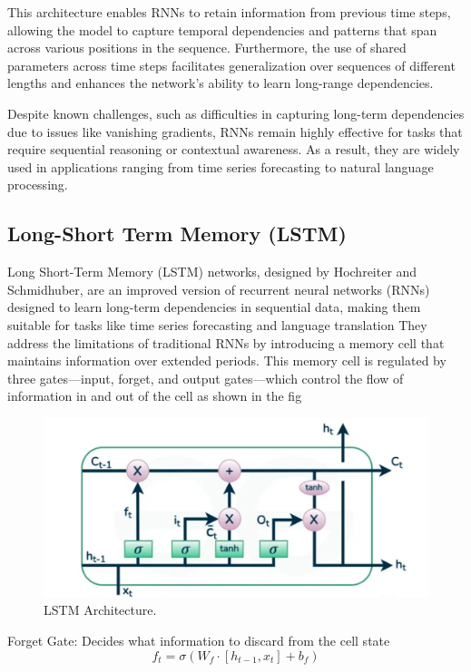 This architecture enables RNNs to retain information from previous time steps, allowing the model to capture temporal dependencies and patterns that span across various positions in the sequence. Furthermore, the use of shared parameters across time steps facilitates generalization over sequences of different lengths and enhances the network's ability to learn long-range dependencies.

Despite known challenges, such as difficulties in capturing long-term dependencies due to issues like vanishing gradients, RNNs remain highly effective for tasks that require sequential reasoning or contextual awareness. As a result, they are widely used in applications ranging from time series forecasting to natural language processing.
\cite{cho2014learning} 

\subsection{ Long-Short Term Memory (LSTM)}
Long Short-Term Memory (LSTM) networks, designed by Hochreiter and Schmidhuber, are an improved version of recurrent neural networks (RNNs) designed to learn long-term dependencies in sequential data, making them suitable for tasks like time series forecasting and language translation
They address the limitations of traditional RNNs by introducing a memory cell that maintains information over extended periods. This memory cell is regulated by three gates—input, forget, and output gates—which control the flow of information in and out of the cell as shown in the fig \cite{geeksforgeeks_lstm}
\begin{figure}[htbp]
	\centering\includegraphics[width=0.9\linewidth]{Figures/LSTM.png}
	\caption{LSTM Architecture.}
	\label{/LSTM.png}
\end{figure}


Forget Gate: Decides what information to discard from the cell state
\begin{equation}
	f_t = \sigma \left( W_f \cdot [h_{t-1}, x_t] + b_f \right)
\end{equation}

